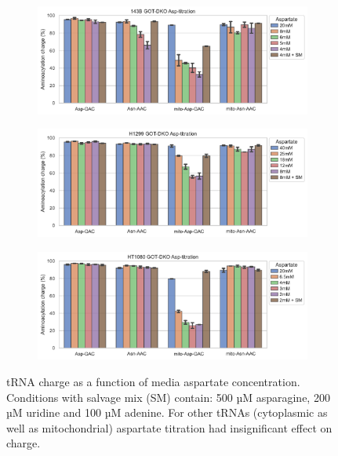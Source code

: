 \begin{figure}[!ht]
     \centering
     \begin{subfigure}[b]{0.7\textwidth}
         \includegraphics[width=\textwidth]{figures/sapp/tRNA/143B-DKO_Asp-Asn.pdf}
     \end{subfigure}
     \begin{subfigure}[b]{0.7\textwidth}
         \vspace{5pt}
         \includegraphics[width=\textwidth]{figures/sapp/tRNA/H1299-DKO_charge_Asp-Asn.pdf}
     \end{subfigure}
     \begin{subfigure}[b]{0.7\textwidth}
         \vspace{5pt}
         \includegraphics[width=\textwidth]{figures/sapp/tRNA/HT1080-DKO_charge_Asp-Asn.pdf}
     \end{subfigure}
     \hfill
        \caption[tRNA charge in GOT DKO Asp-tit]{
        tRNA charge as a function of media aspartate concentration.
        Conditions with salvage mix (SM) contain: 500 µM asparagine, 200 µM uridine and 100 µM adenine.
        For other tRNAs (cytoplasmic as well as mitochondrial) aspartate titration had insignificant effect on charge.
        }
        \label{fig:sapp:tRNA:DKO_Asp-Asn}
\end{figure}


